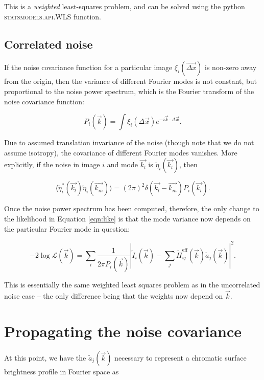 \documentclass{article}
\begin{document}
This is a \textit{weighted} least-squares problem, and can be solved using the python
\textsc{statsmodels.api.WLS} function.

\subsection{Correlated noise}

If the noise covariance function for a particular image $\xi_i(\vec{\Delta x})$ is non-zero away
from the origin, then the variance of different Fourier modes is not constant, but proportional to
the noise power spectrum, which is the Fourier transform of the noise covariance function:

\begin{equation}
  P_i(\vec{k}) = \int \xi_i(\Delta \vec{x}) e^{-i \vec{k}\cdot\Delta\vec{x}}.
\end{equation}

Due to assumed translation invariance of the noise (though note that we do not assume isotropy), the
covariance of different Fourier modes vanishes.  More explicitly, if the noise in image $i$ and mode
$\vec{k_l}$ is $\tilde\eta_i(\vec{k_l})$, then

\begin{equation}
  \langle\tilde\eta_i^*(\vec{k_l})\tilde\eta_i(\vec{k_m})\rangle = (2 \pi)^2 \delta(\vec{k_l} - \vec{k_m})P_i(\vec{k_l}).
\end{equation}

Once the noise power spectrum has been computed, therefore, the only change to the likelihood in
Equation \ref{eqn:like} is that the mode variance now depends on the particular Fourier mode in
question:

\begin{equation}
    \label{eqn:likecorr}
    -2 \log \mathcal{L}(\vec{k}) = \sum_i\frac{1}{2 \pi P_i(\vec{k})}\left|\tilde{I}_i(\vec{k}) - \sum_j \tilde{\Pi}^\mathrm{eff}_{ij}(\vec{k}) \tilde{a}_j(\vec{k})\right|^2.
\end{equation}

This is essentially the same weighted least squares problem as in the uncorrelated noise case -- the
only difference being that the weights now depend on $\vec{k}$.

\section{Propagating the noise covariance}

At this point, we have the $\tilde{a}_j(\vec{k})$ necessary to represent a chromatic surface
brightness profile in Fourier space as
\end{document}

